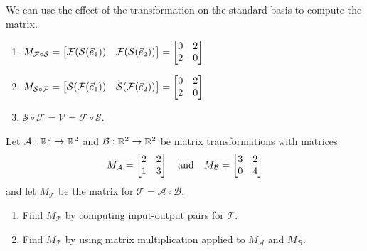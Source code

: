 \begin{exercises}
\begin{problist}
\begin{solution}
\begin{enumerate}
					We can use the effect of the transformation on the
					standard basis to compute the matrix.
					\begin{enumerate}
						\item $M_{\mathcal F \circ \mathcal S}=\mat{\mathcal
							F( \mathcal S(\xhat))& \mathcal F(\mathcal
							S(\yhat))}=\mat{0&2\\2&0}$

						\item $M_{\mathcal S \circ \mathcal F}=\mat{\mathcal
							S( \mathcal F(\xhat))& \mathcal S(\mathcal
							F(\yhat))}=\mat{0&2\\2&0}$

						\item $\mathcal S\circ \mathcal F=
							\mathcal V = \mathcal F \circ
							\mathcal S$.
					\end{enumerate}
			\end{enumerate}
		\end{solution}

		\prob Let $\mathcal A: \mathbb{R}^{2}\to \mathbb{R}^{2}$ and
		$\mathcal B: \mathbb{R}^{2}\to \mathbb{R}^{2}$ be matrix transformations with matrices
		\[
			M_{\mathcal A}= \mat{2&2\\1&3}\quad \text{and}\quad M_{\mathcal B}=
			\mat{3&2\\0&4}
		\]
		 and let $M_{\mathcal T}$ be the matrix for
		$\mathcal T=\mathcal A\circ\mathcal B$.
		\begin{enumerate}
			\item Find $M_{\mathcal T}$ by computing input-output pairs for $\mathcal
				T$.

			\item Find $M_{\mathcal T}$ by using matrix multiplication applied
				to $M_{\mathcal A}$ and $M_{\mathcal B}$.
		\end{enumerate}


		\begin{solution}


\end{solution}
\end{problist}
\end{exercises}
